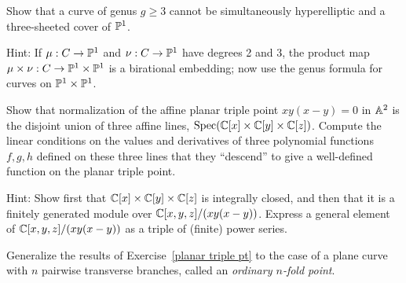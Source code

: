 \begin{exercise}\label{gonality exclusion}
Show that a curve of genus $g \geq 3$ cannot be simultaneously hyperelliptic and a three-sheeted cover of $\PP^1$.

Hint: If $\mu : C \to \PP^1$ and $\nu : C \to \PP^1$ have degrees 2 and 3, the product map $\mu \times \nu : C \to \PP^1 \times \PP^1$ is a birational embedding; now use the genus formula for curves on $\PP^1 \times \PP^1$.
\end{exercise}

\begin{exercise}\label{planar triple pt}
Show that normalization of the affine planar triple point $xy(x-y) = 0$ in $\AA^2$ is the disjoint union of three
affine lines, $\Spec(\CC[x] \times \CC[y]\times \CC[z])$. Compute the linear conditions on the values and derivatives of three polynomial functions $f,g,h$ defined on
these three lines that they ``descend'' to give a well-defined function on the planar triple point.

Hint: Show first that $\CC[x] \times \CC[y]\times \CC[z]$ is integrally closed, and then that it is a finitely generated module over $\CC[x,y,z]/(xy(x-y))$.
Express a general element of $\CC[x,y,z]/(xy(x-y))$ as a triple of (finite) power series.
\end{exercise}

\begin{exercise} Generalize the results of Exercise~\ref{planar triple pt} to the case of a plane curve with $n$ pairwise
transverse branches, called an \emph{ordinary $n$-fold point}.
\end{exercise}


